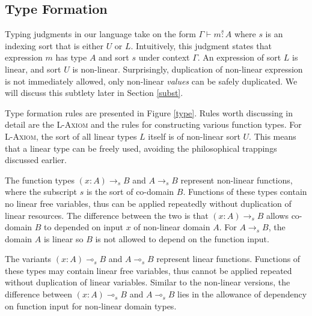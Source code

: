 \documentclass{article}
\newcommand{\rname}[1]{\textsc{\footnotesize #1}}
\newcommand{\stype}[1]{\overset{#1}{:}}
\begin{document}
  \subsection{Type Formation} \label{tyformation}
  Typing judgments in our language take on the form $\Gamma \vdash m \stype{s} A$ where $s$ is an indexing sort that is either $U$ or $L$. Intuitively, this judgment states that expression $m$ has type $A$ and sort $s$ under context $\Gamma$. An expression of sort $L$ is linear, and sort $U$ is non-linear. Surprisingly, duplication of non-linear expression is not immediately allowed, only non-linear \textit{values} can be safely duplicated. We will discuss this subtlety later in Section \ref{subst}.
  
  Type formation rules are presented in Figure \ref{type}. Rules worth discussing in detail are the \rname{L-Axiom} and the rules for constructing various function types. For \rname{L-Axiom}, the sort of all linear types $L$ itself is of non-linear sort $U$. This means that a linear type can be freely used, avoiding the philosophical trappings discussed earlier.

  The function types $(x : A) \rightarrow_s B$ and $A \rightarrow_s B$ represent non-linear functions, where the subscript $s$ is the sort of co-domain $B$. Functions of these types contain no linear free variables, thus can be applied repeatedly without duplication of linear resources. The difference between the two is that $(x : A) \rightarrow_s B$ allows co-domain $B$ to depended on input $x$ of non-linear domain $A$. For $A \rightarrow_s B$, the domain $A$ is linear so $B$ is not allowed to depend on the function input.

  The variants $(x : A) \multimap_s B$ and $A \multimap_s B$ represent linear functions. Functions of these types may contain linear free variables, thus cannot be applied repeated without duplication of linear variables. Similar to the non-linear versions, the difference between $(x : A) \multimap_s B$ and $A \multimap_s B$ lies in the allowance of dependency on function input for non-linear domain types.
\end{document}
